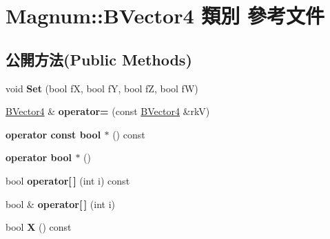 \hypertarget{class_magnum_1_1_b_vector4}{}\section{Magnum\+:\+:B\+Vector4 類別 參考文件}
\label{class_magnum_1_1_b_vector4}
\subsection*{公開方法(Public Methods)}
\begin{DoxyCompactItemize}
\item 
void {\bfseries Set} (bool fX, bool fY, bool fZ, bool fW)\hypertarget{class_magnum_1_1_b_vector4_a5e665ca9ffbc928a870f67d97a0ba737}{}\label{class_magnum_1_1_b_vector4_a5e665ca9ffbc928a870f67d97a0ba737}

\item 
\hyperlink{class_magnum_1_1_b_vector4}{B\+Vector4} \& {\bfseries operator=} (const \hyperlink{class_magnum_1_1_b_vector4}{B\+Vector4} \&rkV)\hypertarget{class_magnum_1_1_b_vector4_a2c7eeac07b116f1aa72bc61cc54d9efa}{}\label{class_magnum_1_1_b_vector4_a2c7eeac07b116f1aa72bc61cc54d9efa}

\item 
{\bfseries operator const bool $\ast$} () const \hypertarget{class_magnum_1_1_b_vector4_acc75dfbc38cbaa78fe7cdf176527f686}{}\label{class_magnum_1_1_b_vector4_acc75dfbc38cbaa78fe7cdf176527f686}

\item 
{\bfseries operator bool $\ast$} ()\hypertarget{class_magnum_1_1_b_vector4_a650319d17cd328ecef2c5231f2dccd60}{}\label{class_magnum_1_1_b_vector4_a650319d17cd328ecef2c5231f2dccd60}

\item 
bool {\bfseries operator\mbox{[}$\,$\mbox{]}} (int i) const \hypertarget{class_magnum_1_1_b_vector4_a0c6c0dace1231e6ed8d9eff4bc73815c}{}\label{class_magnum_1_1_b_vector4_a0c6c0dace1231e6ed8d9eff4bc73815c}

\item 
bool \& {\bfseries operator\mbox{[}$\,$\mbox{]}} (int i)\hypertarget{class_magnum_1_1_b_vector4_ac69f2bfaf85e72b583f730f9a0abfd98}{}\label{class_magnum_1_1_b_vector4_ac69f2bfaf85e72b583f730f9a0abfd98}

\item 
bool {\bfseries X} () const \hypertarget{class_magnum_1_1_b_vector4_afe34ba3249e82b19b1b2c29913e33dfa}{}\label{class_magnum_1_1_b_vector4_afe34ba3249e82b19b1b2c29913e33dfa}


\end{DoxyCompactItemize}
